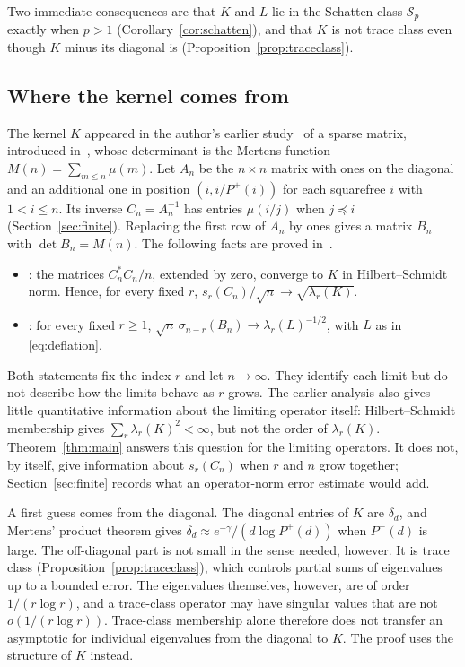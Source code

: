 Two immediate consequences are that $K$ and $L$ lie in the Schatten class
$\mathcal S_p$ exactly when $p>1$ (Corollary~\ref{cor:schatten}), and that
$K$ is not trace class even though $K$ minus its diagonal is
(Proposition~\ref{prop:traceclass}).

\subsection{Where the kernel comes from}
The kernel $K$ appeared in the author's earlier study~\cite{Kline} of a
sparse matrix, introduced in~\cite{Kline19}, whose determinant is the
Mertens function $M(n)=\sum_{m\le n}\mu(m)$. Let $A_n$ be
the $n\times n$ matrix with ones on the diagonal and an additional one in
position $(i,i/P^+(i))$ for each squarefree $i$ with $1<i\le n$. Its inverse
$C_n=A_n^{-1}$ has entries $\mu(i/j)$ when $j\preceq i$
(Section~\ref{sec:finite}). Replacing the first row of $A_n$ by ones gives
a matrix $B_n$ with $\det B_n=M(n)$. The following facts are proved
in~\cite{Kline}.
\begin{itemize}
\item \cite[Theorem~4.3]{Kline}: the matrices $C_n^*C_n/n$, extended by zero,
 converge to $K$ in Hilbert--Schmidt norm. Hence, for every fixed $r$,
 $s_r(C_n)/\sqrt n\to\sqrt{\lambda_r(K)}$.
\item \cite[Theorem~4.6]{Kline}: for every fixed $r\ge1$,
 $\sqrt n\,\sigma_{n-r}(B_n)\to\lambda_r(L)^{-1/2}$, with $L$ as in
 \eqref{eq:deflation}.
\end{itemize}
Both statements fix the index $r$ and let $n\to\infty$. They identify each
limit but do not describe how the limits behave as $r$ grows. The earlier
analysis also gives little quantitative information about the limiting
operator itself: Hilbert--Schmidt membership gives
$\sum_r\lambda_r(K)^2<\infty$, but not the order of $\lambda_r(K)$.
Theorem~\ref{thm:main} answers this question for the limiting operators.
It does not, by itself, give information about $s_{r}(C_n)$ when $r$ and
$n$ grow together; Section~\ref{sec:finite} records what an operator-norm
error estimate would add.

A first guess comes from the diagonal. The diagonal entries of $K$ are
$\delta_d$, and Mertens' product theorem gives
$\delta_d\approx e^{-\gamma}/(d\log P^+(d))$ when $P^+(d)$ is large. The
off-diagonal part is not small in the sense needed, however. It is trace
class (Proposition~\ref{prop:traceclass}), which controls partial sums of
eigenvalues up to a bounded error. The eigenvalues themselves, however,
are of order $1/(r\log r)$, and a trace-class operator may have singular
values that are not $o(1/(r\log r))$. Trace-class membership alone
therefore does not transfer an asymptotic for individual eigenvalues from
the diagonal to $K$. The proof uses the structure of $K$ instead.


